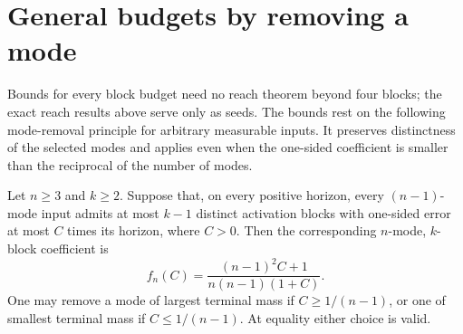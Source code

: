 \section{General budgets by removing a mode}\label{sec:general-budgets}

Bounds for every block budget need no reach theorem beyond four blocks;
the exact reach results above serve only as seeds. The bounds rest on the
following mode-removal principle for arbitrary measurable inputs. It
preserves distinctness of the selected modes and applies even when the
one-sided coefficient is smaller than the reciprocal of the number of
modes.

\begin{lemma}\label{lem:mode-removal}
Let $n\ge3$ and $k\ge2$. Suppose that, on every positive horizon, every
$(n-1)$-mode input admits at most $k-1$ distinct activation blocks with
one-sided error at most $C$ times its horizon, where $C>0$. Then the
corresponding $n$-mode, $k$-block coefficient is
\begin{equation}\label{eq:mode-removal}
 f_n(C)=\frac{(n-1)^2C+1}{n(n-1)(1+C)}.
\end{equation}
One may remove a mode of largest terminal mass if $C\ge1/(n-1)$, or
one of smallest terminal mass if $C\le1/(n-1)$. At equality either choice
is valid.
\end{lemma}
